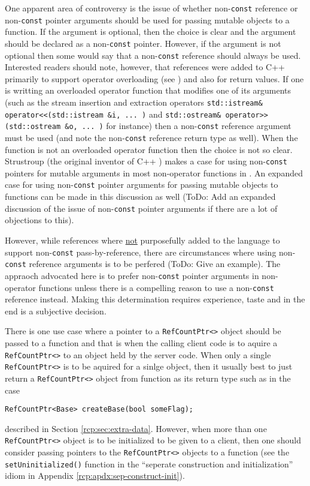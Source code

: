 One apparent area of controversy is the issue of whether
non-\texttt{const} reference or non-\texttt{const} pointer arguments
should be used for passing mutable objects to a function.  If the
argument is optional, then the choice is clear and the argument should
be declared as a non-\texttt{const} pointer.  However, if the argument
is not optional then some would say that a non-\texttt{const}
reference should always be used.  Interested readers should note,
however, that references were added to C++ primarily to support
operator overloading (see {}\cite[Section 3.7]{ref:design_evol_cpp})
and also for return values.  If one is writting an overloaded operator
function that modifies one of its arguments (such as the stream
insertion and extraction operators {}\texttt{std::istream\&
operator<<(std::istream
\&i, ... )} and {}\texttt{std::ostream\& operator>>(std::ostream \&o,
... )} for instance) then a non-\texttt{const} reference argument must
be used (and note the non-\texttt{const} reference return type as
well).  When the function is not an overloaded operator function then
the choice is not so clear.  Strustroup (the original inventor of C++
{}\cite{ref:design_evol_cpp}) makes a case for using
non-\texttt{const} pointers for mutable arguments in most non-operator
functions in {}\cite[Section 5.5]{ref:stroustrup_2000}.  An expanded
case for using non-\texttt{const} pointer arguments for passing
mutable objects to functions can be made in this discussion as well
(ToDo: Add an expanded discussion of the issue of non-\texttt{const}
pointer arguments if there are a lot of objections to this).

However, while references where {}\underline{not} purposefully added
to the language to support non-\texttt{const} pass-by-reference, there
are circumstances where using non-\texttt{const} reference arguments
is to be perfered (ToDo: Give an example).  The appraoch advocated
here is to prefer non-\texttt{const} pointer arguments in non-operator
functions unless there is a compelling reason to use a
non-\texttt{const} reference instead.  Making this determination
requires experience, taste and in the end is a subjective decision.

There is one use case where a pointer to a {}\texttt{RefCountPtr<>}
object should be passed to a function and that is when the calling
client code is to aquire a {}\texttt{RefCountPtr<>} to an object held
by the server code.  When only a single {}\texttt{RefCountPtr<>} is to
be aquired for a sinlge object, then it usually best to just return
a {}\texttt{RefCountPtr<>} object from function as its return type
such as in the case
%
{\scriptsize\begin{verbatim}
RefCountPtr<Base> createBase(bool someFlag);
\end{verbatim}}
%
{}\noindent{}described in Section {}\ref{rcp:sec:extra-data}.
However, when more than one {}\texttt{RefCountPtr<>} object is to be
initialized to be given to a client, then one should consider passing
pointers to the {}\texttt{RefCountPtr<>} objects to a function (see
the {}\texttt{setUninitialized()} function in the ``seperate
construction and initialization'' idiom in Appendix
{}\ref{rcp:apdx:sep-construct-init}).
